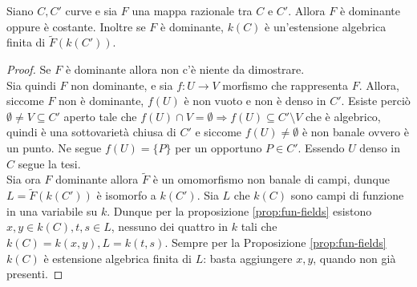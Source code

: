     \begin{esercizio} \label{ex:dm}
        Siano $C,C'$ curve e sia $F$ una mappa razionale tra $C$ e $C'$. Allora $F$ è dominante oppure è costante. Inoltre se $F$ è dominante, $k(C)$ è un'estensione algebrica finita di $\tilde{F}(k(C'))$.
    \end{esercizio}
    \begin{proof}
        Se $F$ è dominante allora non c'è niente da dimostrare. \\
        Sia quindi $F$ non dominante, e sia $f : U \to V$ morfismo che rappresenta $F$. Allora, siccome $F$ non è dominante, $f(U)$ è non vuoto e non è denso in $C'$. Esiste perciò $\emptyset \neq V \subseteq C'$ aperto tale che $f(U) \cap V = \emptyset \Longrightarrow f(U) \subseteq C' 
        \setminus V$ che è algebrico, quindi è una sottovarietà chiusa di $C'$ e siccome $f(U) \neq \emptyset$ è non banale ovvero è un punto. Ne segue $f(U) = \{P\}$ per un opportuno $P \in C'$. Essendo $U$ denso in $C$ segue la tesi. \\
        Sia ora $F$ dominante allora $\tilde{F}$ è un omomorfismo non banale di campi, dunque $L = \tilde{F}(k(C'))$ è isomorfo a $k(C')$. Sia $L$ che $k(C)$ sono campi di funzione in una variabile su $k$. Dunque per la proposizione \ref{prop:fun-fields} esistono $x,y \in k(C), t,s \in L$, 
        nessuno dei quattro in $k$ tali che $k(C) = k(x,y), L = k(t,s)$. Sempre per la Proposizione \ref{prop:fun-fields} $k(C)$ è estensione algebrica finita di $L$: basta aggiungere $x,y$, quando non già presenti.
    \end{proof}

\newpage

